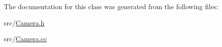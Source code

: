 The documentation for this class was generated from the following files\+:\begin{DoxyCompactItemize}
\item 
src/\hyperlink{Camera_8h}{Camera.\+h}\item 
src/\hyperlink{Camera_8cc}{Camera.\+cc}\end{DoxyCompactItemize}
